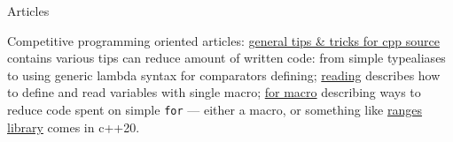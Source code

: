 \begin{rSection}{Articles}

    Competitive programming oriented articles:
    \href{https://codeforces.com/blog/entry/79446}{general tips \& tricks for cpp source} contains various tips can reduce amount of written code: from simple typealiases to using generic lambda syntax for comparators defining;
    \href{https://codeforces.com/blog/entry/79066}{reading} describes how to define and read variables with single macro;
    \href{https://codeforces.com/blog/entry/79100}{for macro} describing ways to reduce code spent on simple \texttt{for} --- either a macro, or something like \href{https://en.cppreference.com/w/cpp/ranges}{ranges library} comes in c++20.

\end{rSection}
